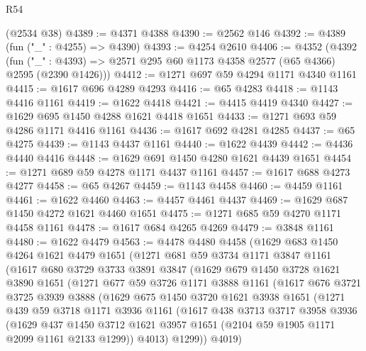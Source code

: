 \begin{lexlean}{R54}
\begin{coremodule}
    (@2534 @38)
@4389 := @4371 @4388
@4390 := @2562 @146
@4392 := @4389 (fun ("_" : @4255) => @4390)
@4393 := @4254 @2610
@4406 := @4352
    (@4392 (fun ("_" : @4393) => @2571 @295 @60 @1173 @4358 @2577 (@65 @4366) @2595 (@2390 @1426)))
@4412 := @1271 @697 @59 @4294 @1171 @4340 @1161
@4415 := @1617 @696 @4289 @4293
@4416 := @65 @4283
@4418 := @1143 @4416 @1161
@4419 := @1622 @4418
@4421 := @4415 @4419 @4340
@4427 := @1629 @695 @1450 @4288 @1621 @4418 @1651
@4433 := @1271 @693 @59 @4286 @1171 @4416 @1161
@4436 := @1617 @692 @4281 @4285
@4437 := @65 @4275
@4439 := @1143 @4437 @1161
@4440 := @1622 @4439
@4442 := @4436 @4440 @4416
@4448 := @1629 @691 @1450 @4280 @1621 @4439 @1651
@4454 := @1271 @689 @59 @4278 @1171 @4437 @1161
@4457 := @1617 @688 @4273 @4277
@4458 := @65 @4267
@4459 := @1143 @4458
@4460 := @4459 @1161
@4461 := @1622 @4460
@4463 := @4457 @4461 @4437
@4469 := @1629 @687 @1450 @4272 @1621 @4460 @1651
@4475 := @1271 @685 @59 @4270 @1171 @4458 @1161
@4478 := @1617 @684 @4265 @4269
@4479 := @3848 @1161
@4480 := @1622 @4479
@4563 := @4478
    @4480
    @4458
    (@1629
      @683
      @1450
      @4264
      @1621
      @4479
      @1651
      (@1271
        @681
        @59
        @3734
        @1171
        @3847
        @1161
        (@1617
          @680
          @3729
          @3733
          @3891
          @3847
          (@1629
            @679
            @1450
            @3728
            @1621
            @3890
            @1651
            (@1271
              @677
              @59
              @3726
              @1171
              @3888
              @1161
              (@1617
                @676
                @3721
                @3725
                @3939
                @3888
                (@1629
                  @675
                  @1450
                  @3720
                  @1621
                  @3938
                  @1651
                  (@1271
                    @439
                    @59
                    @3718
                    @1171
                    @3936
                    @1161
                    (@1617
                      @438
                      @3713
                      @3717
                      @3958
                      @3936
                      (@1629
                        @437
                        @1450
                        @3712
                        @1621
                        @3957
                        @1651
                        (@2104 @59 @1905 @1171 @2099 @1161 @2133 @1299))
                      @4013)
                    @1299))
                @4019)

\end{coremodule}
\end{lexlean}
